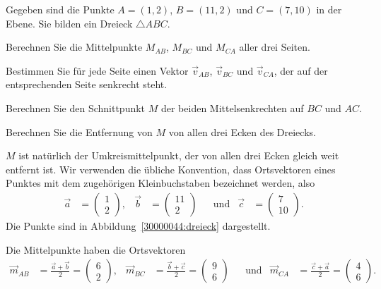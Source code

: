 Gegeben sind die Punkte $A=(1,2)$, $B=(11,2)$ und $C=(7,10)$
in der Ebene.
Sie bilden ein Dreieck $\triangle ABC$.
\begin{teilaufgaben}
\item Berechnen Sie die Mittelpunkte $M_{AB}$, $M_{BC}$ und $M_{CA}$ aller drei
Seiten.
\item Bestimmen Sie für jede Seite einen Vektor $\vec{v}_{AB}$, $\vec{v}_{BC}$
und $\vec{v}_{CA}$, der auf der entsprechenden Seite senkrecht steht.
\item Berechnen Sie den Schnittpunkt $M$ der beiden Mittelsenkrechten auf
$BC$ und $AC$.
\item Berechnen Sie die Entfernung von $M$ von allen drei Ecken des Dreiecks.
\end{teilaufgaben}

\begin{loesung}
$M$ ist natürlich der Umkreismittelpunkt, der von allen drei Ecken gleich
weit entfernt ist.
Wir verwenden die übliche Konvention, dass Ortsvektoren eines Punktes
mit dem zugehörigen Kleinbuchstaben bezeichnet werden, also
\[
\begin{aligned}
\vec{a}&=\begin{pmatrix} 1\\ 2\end{pmatrix},&
\vec{b}&=\begin{pmatrix}11\\ 2\end{pmatrix}&
&\text{und}&
\vec{c}&=\begin{pmatrix} 7\\10\end{pmatrix}.
\end{aligned}
\]
Die Punkte sind in Abbildung~\ref{30000044:dreieck} dargestellt.
\begin{teilaufgaben}
%
%
\item Die Mittelpunkte haben die Ortsvektoren
\[
\begin{aligned}
\vec{m}_{AB}&=\frac{\vec{a}+\vec{b}}2=\begin{pmatrix}6\\2\end{pmatrix},
&
\vec{m}_{BC}&=\frac{\vec{b}+\vec{c}}2=\begin{pmatrix}9\\6\end{pmatrix}
&
&\text{und}&
\vec{m}_{CA}&=\frac{\vec{c}+\vec{a}}2=\begin{pmatrix}4\\6\end{pmatrix}.

\end{aligned}\]
\end{teilaufgaben}
\end{loesung}
